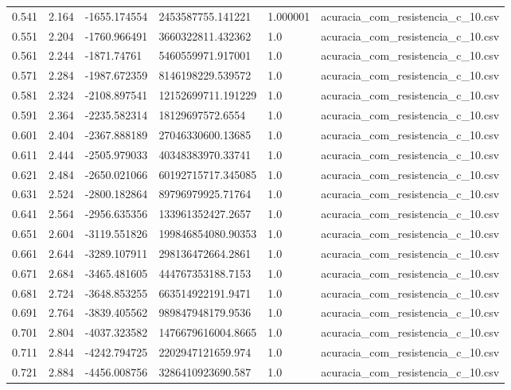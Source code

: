 \begin{table}
\begin{tabular}{llllll}
0.541 & 2.164 & -1655.174554 & 2453587755.141221 & 1.000001 & acuracia\_com\_resistencia\_c\_10.csv \\
0.551 & 2.204 & -1760.966491 & 3660322811.432362 & 1.0 & acuracia\_com\_resistencia\_c\_10.csv \\
0.561 & 2.244 & -1871.74761 & 5460559971.917001 & 1.0 & acuracia\_com\_resistencia\_c\_10.csv \\
0.571 & 2.284 & -1987.672359 & 8146198229.539572 & 1.0 & acuracia\_com\_resistencia\_c\_10.csv \\
0.581 & 2.324 & -2108.897541 & 12152699711.191229 & 1.0 & acuracia\_com\_resistencia\_c\_10.csv \\
0.591 & 2.364 & -2235.582314 & 18129697572.6554 & 1.0 & acuracia\_com\_resistencia\_c\_10.csv \\
0.601 & 2.404 & -2367.888189 & 27046330600.13685 & 1.0 & acuracia\_com\_resistencia\_c\_10.csv \\
0.611 & 2.444 & -2505.979033 & 40348383970.33741 & 1.0 & acuracia\_com\_resistencia\_c\_10.csv \\
0.621 & 2.484 & -2650.021066 & 60192715717.345085 & 1.0 & acuracia\_com\_resistencia\_c\_10.csv \\
0.631 & 2.524 & -2800.182864 & 89796979925.71764 & 1.0 & acuracia\_com\_resistencia\_c\_10.csv \\
0.641 & 2.564 & -2956.635356 & 133961352427.2657 & 1.0 & acuracia\_com\_resistencia\_c\_10.csv \\
0.651 & 2.604 & -3119.551826 & 199846854080.90353 & 1.0 & acuracia\_com\_resistencia\_c\_10.csv \\
0.661 & 2.644 & -3289.107911 & 298136472664.2861 & 1.0 & acuracia\_com\_resistencia\_c\_10.csv \\
0.671 & 2.684 & -3465.481605 & 444767353188.7153 & 1.0 & acuracia\_com\_resistencia\_c\_10.csv \\
0.681 & 2.724 & -3648.853255 & 663514922191.9471 & 1.0 & acuracia\_com\_resistencia\_c\_10.csv \\
0.691 & 2.764 & -3839.405562 & 989847948179.9536 & 1.0 & acuracia\_com\_resistencia\_c\_10.csv \\
0.701 & 2.804 & -4037.323582 & 1476679616004.8665 & 1.0 & acuracia\_com\_resistencia\_c\_10.csv \\
0.711 & 2.844 & -4242.794725 & 2202947121659.974 & 1.0 & acuracia\_com\_resistencia\_c\_10.csv \\
0.721 & 2.884 & -4456.008756 & 3286410923690.587 & 1.0 & acuracia\_com\_resistencia\_c\_10.csv \\

\end{tabular}
\end{table}
